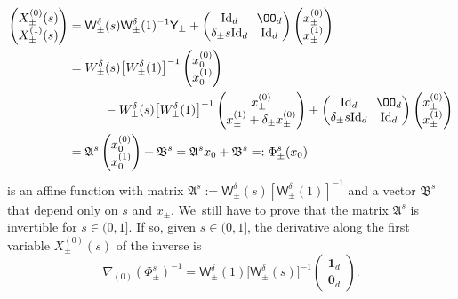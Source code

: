\documentclass[JEP,XML,SOM,Unicode,NoFloatCountersInSection,published]{cedram}
\theoremstyle{definition}
\newcommand{\sW}{{\mathsf W}}
\newcommand{\I}{\textup{Id}}\let\Id\I
\newcommand{\U}{\mathbf{1}}
\newcommand{\V}{\mathbf{0}}
\begin{document}
\begin{align*}
\begin{pmatrix}
X^{(0)}_\pm (s) \\
X^{(1)}_\pm (s)
\end{pmatrix}
&= \sW_\pm ^\delta(s) \sW_\pm ^\delta(1)^{-1} \mathsf Y_\pm+
\arraycolsep3.5pt\begin{pmatrix}
\I_d & \OO_d \\
\delta_\pm s \I_d & \I_d
\end{pmatrix}
\begin{pmatrix}
x_\pm^{(0)}\\
x_\pm^{(1)}
\end{pmatrix}\\
&= W^\delta_\pm(s) \big[W^\delta_\pm(1)\big]^{-1}
\begin{pmatrix}
x_0^{(0)}\\
x_0^{(1)}
\end{pmatrix}\\
&\hspace*{1cm}- W^\delta_\pm(s) \big[W^\delta_\pm(1)\big]^{-1}
\begin{pmatrix}
x^{(0)}_\pm \\ x^{(1)}_\pm + \delta_\pm x^{(0)}_\pm
\end{pmatrix}
+\arraycolsep3.5pt
\begin{pmatrix}
\I_d & \OO_d \\
\delta_\pm s \I_d & \I_d
\end{pmatrix}
\begin{pmatrix}
x_\pm^{(0)}\\
x_\pm^{(1)}
\end{pmatrix} \\
& = \mathfrak A^s \begin{pmatrix} x_0^{(0)} \\
x_0^{(1)} \end{pmatrix} + \mathfrak B^s = \mathfrak A^s
x_0 + \mathfrak B^s =: \Phi^s_\pm (x_0)
\end{align*}
is an affine function with matrix
$\mathfrak A^s:=\sW_\pm ^\delta (s) [\sW_\pm ^\delta (1)]^{-1}$
and a vector $\mathfrak B^s$ that depend only on $s$ and $x_\pm$. We~still have to prove that the matrix $\mathfrak A^s$ is
invertible for $s \in (0,1]$. If so, given $s \in (0,1]$, the
derivative along the first variable $X^{(0)}_\pm(s)$ of the
inverse is
\begin{equation*}
\nabla_{(0)} \left(\Phi_\pm ^s \right)^{-1} =
\sW^\delta_\pm(1)\big[\sW^\delta_\pm(s)\big]^{-1}
\begin{pmatrix}
\U_d \\ \V_d
\end{pmatrix}\!.
\end{equation*}
\end{document}
